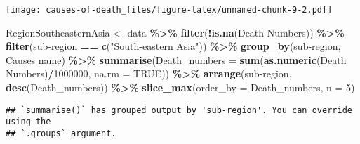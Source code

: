 \documentclass[
]{article}
\newenvironment{Shaded}{\begin{snugshade}}{\end{snugshade}}
\newcommand{\AttributeTok}[1]{\textcolor[rgb]{0.13,0.29,0.53}{#1}}
\newcommand{\ConstantTok}[1]{\textcolor[rgb]{0.56,0.35,0.01}{#1}}
\newcommand{\DecValTok}[1]{\textcolor[rgb]{0.00,0.00,0.81}{#1}}
\newcommand{\FunctionTok}[1]{\textcolor[rgb]{0.13,0.29,0.53}{\textbf{#1}}}
\newcommand{\NormalTok}[1]{#1}
\newcommand{\OtherTok}[1]{\textcolor[rgb]{0.56,0.35,0.01}{#1}}
\newcommand{\SpecialCharTok}[1]{\textcolor[rgb]{0.81,0.36,0.00}{\textbf{#1}}}
\newcommand{\StringTok}[1]{\textcolor[rgb]{0.31,0.60,0.02}{#1}}
\begin{document}
\texttt{[image: causes-of-death\_files/figure-latex/unnamed-chunk-9-2.pdf]}

\begin{Shaded}
\begin{Highlighting}[]
\NormalTok{RegionSoutheasternAsia }\OtherTok{\textless{}{-}}\NormalTok{ data }\SpecialCharTok{\%\textgreater{}\%}
  \FunctionTok{filter}\NormalTok{(}\SpecialCharTok{!}\FunctionTok{is.na}\NormalTok{(}\StringTok{\textasciigrave{}}\AttributeTok{Death Numbers}\StringTok{\textasciigrave{}}\NormalTok{)) }\SpecialCharTok{\%\textgreater{}\%}
  \FunctionTok{filter}\NormalTok{(}\StringTok{\textasciigrave{}}\AttributeTok{sub{-}region}\StringTok{\textasciigrave{}} \SpecialCharTok{==} \FunctionTok{c}\NormalTok{(}\StringTok{"South{-}eastern Asia"}\NormalTok{)) }\SpecialCharTok{\%\textgreater{}\%}
  \FunctionTok{group\_by}\NormalTok{(}\StringTok{\textasciigrave{}}\AttributeTok{sub{-}region}\StringTok{\textasciigrave{}}\NormalTok{, }\StringTok{\textasciigrave{}}\AttributeTok{Causes name}\StringTok{\textasciigrave{}}\NormalTok{) }\SpecialCharTok{\%\textgreater{}\%}
  \FunctionTok{summarise}\NormalTok{(}\AttributeTok{Death\_numbers =} \FunctionTok{sum}\NormalTok{(}\FunctionTok{as.numeric}\NormalTok{(}\StringTok{\textasciigrave{}}\AttributeTok{Death Numbers}\StringTok{\textasciigrave{}}\NormalTok{)}\SpecialCharTok{/}\DecValTok{1000000}\NormalTok{, }\AttributeTok{na.rm =} \ConstantTok{TRUE}\NormalTok{)) }\SpecialCharTok{\%\textgreater{}\%}
  \FunctionTok{arrange}\NormalTok{(}\StringTok{\textasciigrave{}}\AttributeTok{sub{-}region}\StringTok{\textasciigrave{}}\NormalTok{, }\FunctionTok{desc}\NormalTok{(Death\_numbers)) }\SpecialCharTok{\%\textgreater{}\%}
  \FunctionTok{slice\_max}\NormalTok{(}\AttributeTok{order\_by =}\NormalTok{ Death\_numbers, }\AttributeTok{n =} \DecValTok{5}\NormalTok{)}
\end{Highlighting}
\end{Shaded}

\begin{verbatim}
## `summarise()` has grouped output by 'sub-region'. You can override using the
## `.groups` argument.
\end{verbatim}
\end{document}
